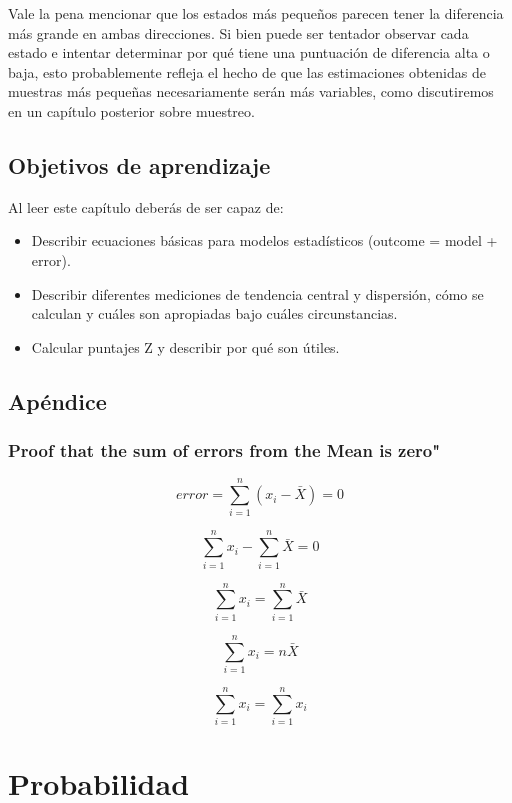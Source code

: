 \documentclass[
  12pt,
]{book}
\providecommand{\tightlist}{%
  \setlength{\itemsep}{0pt}\setlength{\parskip}{0pt}}
\begin{document}
Vale la pena mencionar que los estados más pequeños parecen tener la diferencia más grande en ambas direcciones. Si bien puede ser tentador observar cada estado e intentar determinar por qué tiene una puntuación de diferencia alta o baja, esto probablemente refleja el hecho de que las estimaciones obtenidas de muestras más pequeñas necesariamente serán más variables, como discutiremos en un capítulo posterior sobre muestreo.

\hypertarget{objetivos-de-aprendizaje}{%
\section{Objetivos de aprendizaje}\label{objetivos-de-aprendizaje}}

Al leer este capítulo deberás de ser capaz de:

\begin{itemize}
\tightlist
\item
  Describir ecuaciones básicas para modelos estadísticos (outcome = model + error).
\item
  Describir diferentes mediciones de tendencia central y dispersión, cómo se calculan y cuáles son apropiadas bajo cuáles circunstancias.
\item
  Calcular puntajes Z y describir por qué son útiles.
\end{itemize}

\hypertarget{apuxe9ndice}{%
\section{Apéndice}\label{apuxe9ndice}}

\hypertarget{proof-that-the-sum-of-errors-from-the-mean-is-zero}{%
\subsection{Proof that the sum of errors from the Mean is zero"}\label{proof-that-the-sum-of-errors-from-the-mean-is-zero}}

\[
error = \sum_{i=1}^{n}(x_i - \bar{X}) = 0
\]

\[
\sum_{i=1}^{n}x_i - \sum_{i=1}^{n}\bar{X}=0
\]

\[
\sum_{i=1}^{n}x_i = \sum_{i=1}^{n}\bar{X}
\]

\[
\sum_{i=1}^{n}x_i = n\bar{X}
\]

\[
\sum_{i=1}^{n}x_i = \sum_{i=1}^{n}x_i
\]

\hypertarget{probability}{%
\chapter{Probabilidad}\label{probability}}
\end{document}
